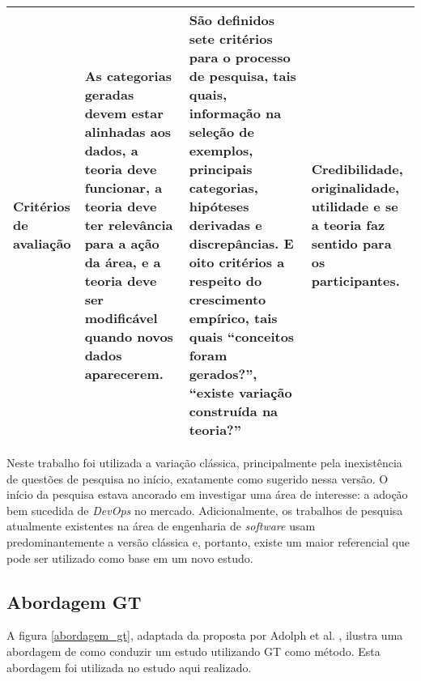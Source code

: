 \begin{table}[hb!]
{\begin{tabular}{|p{3cm}|p{5.7cm}|p{5.7cm}|p{5.7cm}|}
\textbf{Critérios de avaliação}
& As categorias geradas devem estar alinhadas aos dados, a teoria deve funcionar, a teoria deve ter relevância para a ação da área, e a teoria deve ser modificável quando novos dados aparecerem.
& São definidos sete critérios para o processo de pesquisa, tais quais, informação na seleção de exemplos, principais categorias, hipóteses derivadas e discrepâncias. E oito critérios a respeito do crescimento empírico, tais quais ``conceitos foram gerados?'', ``existe variação construída na teoria?''
& Credibilidade, originalidade, utilidade e se a teoria faz sentido para os participantes. \\
\hline

\end{tabular}}
\end{table}

Neste trabalho foi utilizada a variação clássica, principalmente pela
inexistência de questões de pesquisa no início, exatamente como
sugerido nessa versão. O início da pesquisa estava ancorado em investigar uma
área de interesse: a adoção bem sucedida de \textit{DevOps} no mercado.
Adicionalmente, os trabalhos de pesquisa atualmente existentes na área
de engenharia de \textit{software} usam predominantemente a versão clássica
\cite{stol2016grounded} e, portanto, existe um maior referencial que pode ser
utilizado como base em um novo estudo.

\subsection{Abordagem \acrshort{GT}}\label{subsecao:abordagem_gt}

A figura \ref{abordagem_gt}, adaptada da proposta por Adolph et al.
\cite{using_gt_adolph}, ilustra uma abordagem de como conduzir um estudo
utilizando \acrshort{GT} como método. Esta abordagem foi utilizada no estudo
aqui realizado.

%

